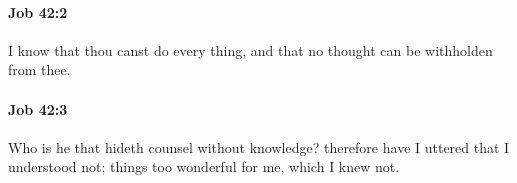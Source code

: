 		\paragraph{Job 42:2} %
			\label{JOB-42-2}

			I know that thou canst do every thing, and that no thought can be withholden from thee.


		\paragraph{Job 42:3} %
			\label{JOB-42-3}

			Who is he that hideth counsel without knowledge? therefore have I uttered that I understood not; things too wonderful for me, which I knew not.


